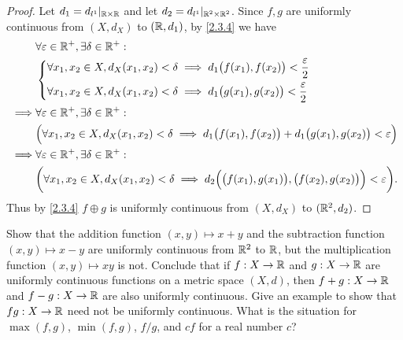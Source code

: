 \begin{proof}
  Let \(d_1 = d_{l^1}|_{\mathbb{R} \times \mathbb{R}}\) and let \(d_2 = d_{l^1}|_{\mathbb{R}^2 \times \mathbb{R}^2}\).
  Since \(f, g\) are uniformly continuous from \((X, d_X)\) to \((\mathbb{R}, d_1)\), by \cref{2.3.4} we have
  \begin{align*}
             & \forall \varepsilon \in \mathbb{R}^+, \exists \delta \in \mathbb{R}^+ :                                                                                            \\
             & \begin{dcases}
                 \forall x_1, x_2 \in X, d_X(x_1, x_2) < \delta \implies d_1\big(f(x_1), f(x_2)\big) < \dfrac{\varepsilon}{2} \\
                 \forall x_1, x_2 \in X, d_X(x_1, x_2) < \delta \implies d_1\big(g(x_1), g(x_2)\big) < \dfrac{\varepsilon}{2}
               \end{dcases}                                       \\
    \implies & \forall \varepsilon \in \mathbb{R}^+, \exists \delta \in \mathbb{R}^+ :                                                                                            \\
             & \Big(\forall x_1, x_2 \in X, d_X(x_1, x_2) < \delta \implies d_1\big(f(x_1), f(x_2)\big) + d_1\big(g(x_1), g(x_2)\big) < \varepsilon\Big)          \\
    \implies & \forall \varepsilon \in \mathbb{R}^+, \exists \delta \in \mathbb{R}^+ :                                                                                            \\
             & \bigg(\forall x_1, x_2 \in X, d_X(x_1, x_2) < \delta \implies d_2\Big(\big(f(x_1), g(x_1)\big), \big(f(x_2), g(x_2)\big)\Big) < \varepsilon\bigg).
  \end{align*}
  Thus by \cref{2.3.4} \(f \oplus g\) is uniformly continuous from \((X, d_X)\) to \((\mathbb{R}^2, d_2)\).
\end{proof}

\begin{ex}\label{ex:2.3.6}
  Show that the addition function \((x, y) \mapsto x + y\) and the subtraction function \((x, y) \mapsto x - y\) are uniformly continuous from \(\mathbb{R}^2\) to \(\mathbb{R}\), but the multiplication function \((x, y) \mapsto xy\) is not.
  Conclude that if \(f : X \to \mathbb{R}\) and \(g : X \to \mathbb{R}\) are uniformly continuous functions on a metric space \((X, d)\), then \(f + g : X \to \mathbb{R}\) and \(f - g : X \to \mathbb{R}\) are also uniformly continuous.
  Give an example to show that \(fg : X \to \mathbb{R}\) need not be uniformly continuous.
  What is the situation for \(\max(f, g)\), \(\min(f, g)\), \(f / g\), and \(cf\) for a real number \(c\)?
\end{ex}

